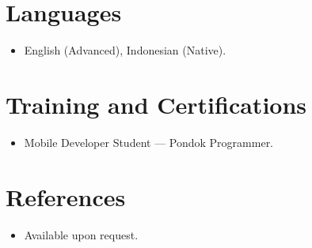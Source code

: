 \documentclass[11pt,a4paper,sans]{moderncv}
\begin{document}

\section{Languages}
\vspace{1pt}
\begin{itemize}
\item English (Advanced), Indonesian (Native).
\end{itemize}


\section{Training and Certifications}
\vspace{1pt}
\begin{itemize}
\item Mobile Developer Student --- Pondok Programmer.
\end{itemize}


\section{References}
\vspace{1pt}
\begin{itemize}
\item{Available upon request.}
\end{itemize}
\end{document}
